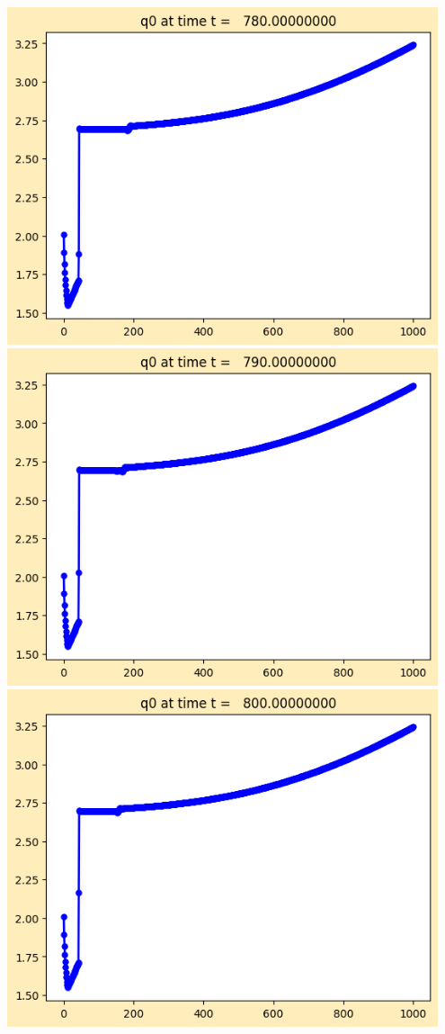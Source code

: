 \documentclass[11pt]{article}
\begin{document}
\vskip 10pt 
\includegraphics[width=0.95\textwidth]{frame0078fig1.png}
\vskip 10pt 
\includegraphics[width=0.95\textwidth]{frame0079fig1.png}
\vskip 10pt 
\includegraphics[width=0.95\textwidth]{frame0080fig1.png}
\end{document}
